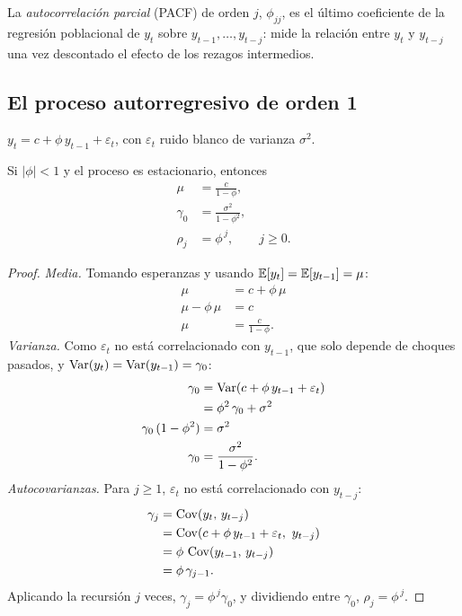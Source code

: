 \begin{definicion}
La \emph{autocorrelación parcial} (PACF) de orden $j$, $\phi_{jj}$, es el último coeficiente de la regresión
poblacional de $y_t$ sobre $y_{t-1},\dots,y_{t-j}$: mide la relación entre $y_t$ y $y_{t-j}$ una vez
descontado el efecto de los rezagos intermedios.
\end{definicion}

\subsection{El proceso autorregresivo de orden 1}

\begin{definicion}[AR(1)]
$y_t=c+\phi\,y_{t-1}+\varepsilon_t$, con $\varepsilon_t$ ruido blanco de varianza $\sigma^2$.
\end{definicion}

\begin{proposicion}\label{prop:ar1}
Si $|\phi|<1$ y el proceso es estacionario, entonces
\begin{align*}
  \mu      &= \frac{c}{1-\phi},\\
  \gamma_0 &= \frac{\sigma^2}{1-\phi^2},\\
  \rho_j   &= \phi^{\,j}, \qquad j\ge0 .
\end{align*}
\end{proposicion}

\begin{proof}
\emph{Media.} Tomando esperanzas y usando $\mathbb{E}[y_t]=\mathbb{E}[y_{t-1}]=\mu$:
\begin{align*}
  \mu           &= c+\phi\,\mu\\
  \mu-\phi\,\mu &= c\\
  \mu           &= \frac{c}{1-\phi}.
\end{align*}
\emph{Varianza.} Como $\varepsilon_t$ no está correlacionado con $y_{t-1}$, que solo depende de choques
pasados, y $\operatorname{Var}(y_t)=\operatorname{Var}(y_{t-1})=\gamma_0$:
\begin{align*}
  \gamma_0               &= \operatorname{Var}(c+\phi\,y_{t-1}+\varepsilon_t)\\
                         &= \phi^2\,\gamma_0+\sigma^2\\
  \gamma_0\,(1-\phi^2)   &= \sigma^2\\
  \gamma_0               &= \frac{\sigma^2}{1-\phi^2}.
\end{align*}
\emph{Autocovarianzas.} Para $j\ge1$, $\varepsilon_t$ no está correlacionado con $y_{t-j}$:
\begin{align*}
  \gamma_j &= \operatorname{Cov}(y_t,\,y_{t-j})\\
           &= \operatorname{Cov}(c+\phi\,y_{t-1}+\varepsilon_t,\ y_{t-j})\\
           &= \phi\,\operatorname{Cov}(y_{t-1},\,y_{t-j})\\
           &= \phi\,\gamma_{j-1}.
\end{align*}
Aplicando la recursión $j$ veces, $\gamma_j=\phi^{\,j}\gamma_0$, y dividiendo entre $\gamma_0$,
$\rho_j=\phi^{\,j}$.
\end{proof}

